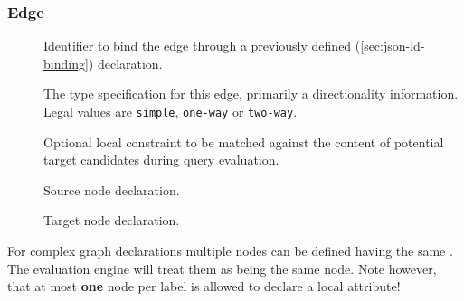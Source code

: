 \documentclass[11pt,a4paper]{article}
\begin{document}
\subsubsection{Edge}
\label{sec:json-ld-edge}
\begin{attributes}{}
\end{attributes}
\begin{description}
	\item[] Identifier to bind the edge through a previously defined  (\ref{sec:json-ld-binding}) declaration.
	\item[] The type specification for this edge, primarily a directionality information. Legal values are \texttt{simple}, \texttt{one-way} or \texttt{two-way}.
\end{description}
\begin{elements}{}
\end{elements}
\begin{description}
	\item[] Optional local constraint to be matched against the content of potential target candidates during query evaluation.
	\item[] Source node declaration. 
	\item[] Target node declaration. 
\end{description}
For complex graph declarations multiple nodes can be defined having the same . The evaluation engine will treat them as being the same node. Note however, that at most \textbf{one} node per label is allowed to declare a local  attribute!
\end{document}

